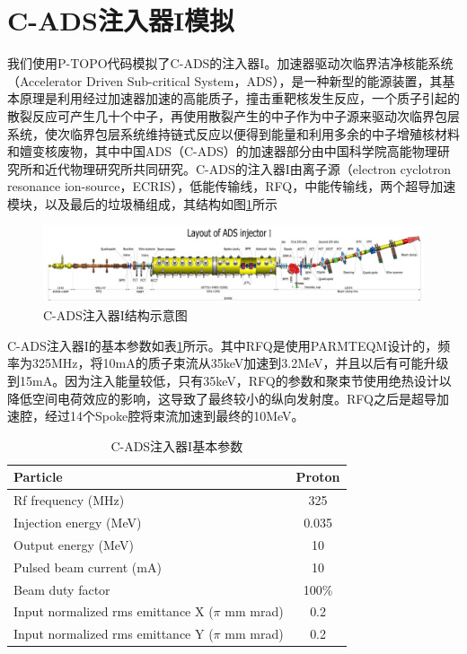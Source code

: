 \section{C-ADS注入器I模拟}

我们使用P-TOPO代码模拟了C-ADS的注入器I。加速器驱动次临界洁净核能系统（Accelerator Driven Sub-critical System，ADS），是一种新型的能源装置，其基本原理是利用经过加速器加速的高能质子，撞击重靶核发生反应，一个质子引起的散裂反应可产生几十个中子，再使用散裂产生的中子作为中子源来驱动次临界包层系统，使次临界包层系统维持链式反应以便得到能量和利用多余的中子增殖核材料和嬗变核废物，其中中国ADS（C-ADS）的加速器部分由中国科学院高能物理研究所和近代物理研究所共同研究。C-ADS的注入器I由离子源（electron cyclotron resonance ion-source，ECRIS），低能传输线，RFQ，中能传输线，两个超导加速模块，以及最后的垃圾桶组成，其结构如图\ref{fig:ADS_layout}所示

\begin{figure}[!htb]
    \centering
    \includegraphics[width=1.05\textwidth]{Img/Layout_of_ADS_Injector_I.jpg}
    \caption{C-ADS注入器I结构示意图}
    \label{fig:ADS_layout}
\end{figure}

C-ADS注入器I的基本参数如表\ref{tab:C_ADS_parameters}所示。其中RFQ是使用PARMTEQM\cite{crandall1998rfq}设计的，频率为325MHz，将10mA的质子束流从35keV加速到3.2MeV，并且以后有可能升级到15mA。因为注入能量较低，只有35keV，RFQ的参数和聚束节使用绝热设计以降低空间电荷效应的影响，这导致了最终较小的纵向发射度。RFQ之后是超导加速腔，经过14个Spoke腔将束流加速到最终的10MeV。

\begin{table}[!htbp]
    \centering
    \footnotesize%
    \setlength{\tabcolsep}{4pt}%
    \renewcommand{\arraystretch}{1.2}%
    \begin{tabular}{lc}
        \hline\hline
        Particle                & Proton \\
        \hline
        Rf frequency (MHz)      & 325       \\
        \hline
        Injection energy (MeV)  & 0.035     \\
        \hline
        Output energy (MeV)     & 10        \\
        \hline
        Pulsed beam current (mA)& 10        \\
        \hline
        Beam duty factor        & 100\%     \\
        \hline
        Input normalized rms emittance X ($\pi$ mm mrad)    & 0.2        \\
        \hline
        Input normalized rms emittance Y ($\pi$ mm mrad)    & 0.2        \\
        \hline\hline
    \end{tabular}
    \caption{C-ADS注入器I基本参数}
    \label{tab:C_ADS_parameters}
\end{table}

